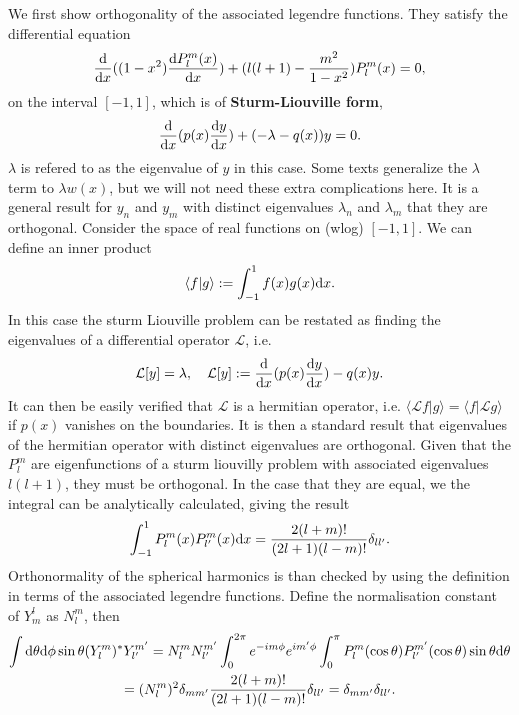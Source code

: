 \documentclass[11pt]{article} %
\DeclareRobustCommand{\d}{\ifmmode\text{d}\else d\fi}
\begin{document}
We first show orthogonality of the associated legendre functions. They satisfy the differential equation
\begin{equation}
    \frac{\d}{\d x}((1-x^2)\frac{\d P^m_l(x)}{\d x}) + (l(l + 1) - \frac{m^2}{1 - x^2})P^m_l(x) = 0,
\end{equation}
on the interval $[-1, 1]$, which is of \textbf{Sturm-Liouville form},
\begin{equation}
    \frac{\d}{\d x}(p(x)\frac{\d y}{\d x}) + (-\lambda - q(x))y = 0.
\end{equation}
$\lambda$ is refered to as the eigenvalue of $y$ in this case. Some texts generalize the $\lambda$ term to $\lambda w(x)$, but we will not need these extra complications here. %
It is a general result for $y_n$ and $y_m$ with distinct eigenvalues $\lambda_n$ and $\lambda_m$ that they are orthogonal. Consider the space of real functions on (wlog) $[-1, 1]$. We can define an inner product
\begin{equation}
    \langle f | g \rangle := \int_{-1}^1 f(x)g(x)\d x.
\end{equation}
In this case the sturm Liouville problem can be restated as finding the eigenvalues of a differential operator $\mathcal L$, i.e.
\begin{equation}
\mathcal L [y] = \lambda, \quad \mathcal L[y] := \frac{\d}{\d x}(p(x)\frac{\d y}{\d x}) - q(x)y.
\end{equation}
It can then be easily verified that $\mathcal L$ is a hermitian operator, i.e. $\langle \mathcal L f | g \rangle = \langle f | \mathcal L g \rangle $ if $p(x)$ vanishes on the boundaries. %
It is then a standard result that eigenvalues of the hermitian operator with distinct eigenvalues are orthogonal. Given that the $P^m_l$ are eigenfunctions of a sturm liouvilly problem with associated eigenvalues $l(l+1)$, they must be orthogonal. In the case that they are equal, we the integral can be analytically calculated, giving the result
\begin{equation}
    \int_{-1}^1 P^m_l(x)P^m_{l'}(x) \d x = \frac{2(l+m)!}{(2l+1)(l-m)!}\delta_{ll'}.
\end{equation}
Orthonormality of the spherical harmonics is than checked by using the definition in terms of the associated legendre functions. Define the normalisation constant of $Y_m^l$ as $N^m_l$, then
\begin{gather}
    \int \d\theta\d \phi \sin\theta (Y^m_l)^* Y^{m'}_{l'} = N_l^mN_{l'}^{m'} \int_0^{2\pi} e^{-im\phi}e^{im'\phi}\int_0^\pi P^m_l(\cos\theta)P^{m'}_{l'}(\cos\theta)\sin\theta\d\theta \\
    = (N_l^m)^2 \delta_{mm'}\frac{2(l+m)!}{(2l+1)(l-m)!}\delta_{ll'} = \delta_{mm'}\delta_{ll'}.
\end{gather}
\end{document}

